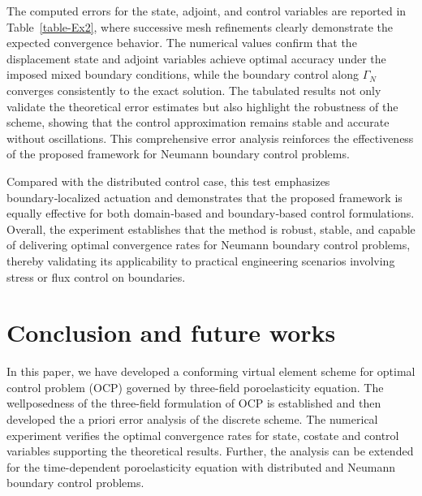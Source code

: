 \documentclass[smallextended]{svjour3}
\numberwithin{equation}{section}
\numberwithin{figure}{section}
\numberwithin{table}{section}
\begin{document}
   	The computed errors for the state, adjoint, and control variables are reported in Table~\ref{table-Ex2}, where successive mesh refinements clearly demonstrate the expected convergence behavior. The numerical values confirm that the displacement state and adjoint variables achieve optimal accuracy under the imposed mixed boundary conditions, while the boundary control along $\Gamma_N$ converges consistently to the exact solution. The tabulated results not only validate the theoretical error estimates but also highlight the robustness of the scheme, showing that the control approximation remains stable and accurate without oscillations. This comprehensive error analysis reinforces the effectiveness of the proposed framework for Neumann boundary control problems.
    
    Compared with the distributed control case, this test emphasizes boundary‑localized actuation and demonstrates that the proposed framework is equally effective for both domain‑based and boundary‑based control formulations. Overall, the experiment establishes that the method is robust, stable, and capable of delivering optimal convergence rates for Neumann boundary control problems, thereby validating its applicability to practical engineering scenarios involving stress or flux control on boundaries.
			
			

			\section{Conclusion and future works}

            In this paper, we have developed a conforming virtual element scheme for optimal control problem (OCP) governed by three-field poroelasticity equation. The wellposedness of the three-field formulation of OCP is established and then developed the a priori error analysis of the discrete scheme. The numerical experiment verifies the optimal convergence rates for state, costate and control variables supporting the theoretical results. Further, the analysis can be extended for the time-dependent poroelasticity equation with distributed and Neumann boundary control problems.
            
\end{document}

